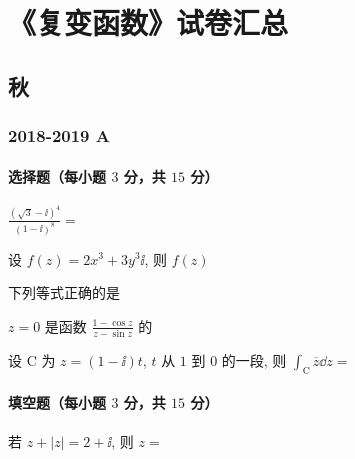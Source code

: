 \chapter{《复变函数》试卷汇总}
\section{秋}
\subsection{2018-2019 A}
\subsubsection{选择题（每小题 $3$ 分，共 $15$ 分）}
\begin{ti}
	$\frac{(\sqrt{3}-\ii)^{4}}{(1-\ii)^{8}}=$ \kuo{}
\end{ti}

\begin{ti}
	设 $f(z)=2 x^{3}+3 y^{3} \ii$, 则 $f(z)$ \kuo{}
\end{ti}

\begin{ti}
	下列等式正确的是 \kuo{}
\end{ti}

\begin{ti}
	$z=0$ 是函数 $\frac{1-\cos z}{z-\sin z}$ 的 \kuo{}
\end{ti}

\begin{ti}
	设 $\mathrm{C}$ 为 $z=(1-\ii)t$, $t$ 从 $1$ 到 $0$ 的一段, 则 $\int_{\mathrm{C}} \overline{z} \dd z=$ \kuo{}
\end{ti}

\subsubsection{填空题（每小题 $3$ 分，共 $15$ 分）}
\begin{ti}
	若 $z+|z|=2+\ii$, 则 $z=$ \hua{}
\end{ti}

